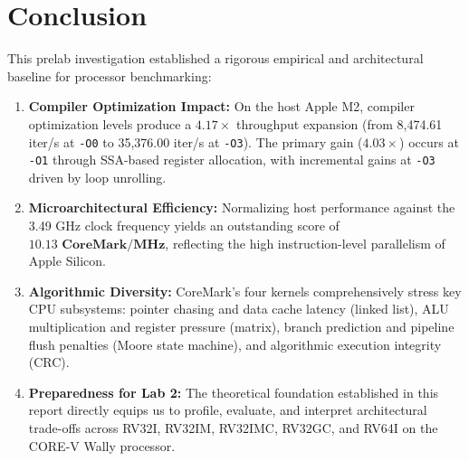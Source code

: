 \documentclass[11pt,a4paper]{article}
\begin{document}
\section{Conclusion}
This prelab investigation established a rigorous empirical and architectural baseline for processor benchmarking:
\begin{enumerate}[leftmargin=1.4em]
    \item \textbf{Compiler Optimization Impact:} On the host Apple M2, compiler optimization levels produce a $\mathbf{4.17\times}$ throughput expansion (from 8,474.61 iter/s at \texttt{-O0} to 35,376.00 iter/s at \texttt{-O3}). The primary gain ($4.03\times$) occurs at \texttt{-O1} through SSA-based register allocation, with incremental gains at \texttt{-O3} driven by loop unrolling.
    \item \textbf{Microarchitectural Efficiency:} Normalizing host performance against the 3.49 GHz clock frequency yields an outstanding score of $\mathbf{10.13\text{ CoreMark/MHz}}$, reflecting the high instruction-level parallelism of Apple Silicon.
    \item \textbf{Algorithmic Diversity:} CoreMark's four kernels comprehensively stress key CPU subsystems: pointer chasing and data cache latency (linked list), ALU multiplication and register pressure (matrix), branch prediction and pipeline flush penalties (Moore state machine), and algorithmic execution integrity (CRC).
    \item \textbf{Preparedness for Lab 2:} The theoretical foundation established in this report directly equips us to profile, evaluate, and interpret architectural trade-offs across RV32I, RV32IM, RV32IMC, RV32GC, and RV64I on the CORE-V Wally processor.
\end{enumerate}
\end{document}

